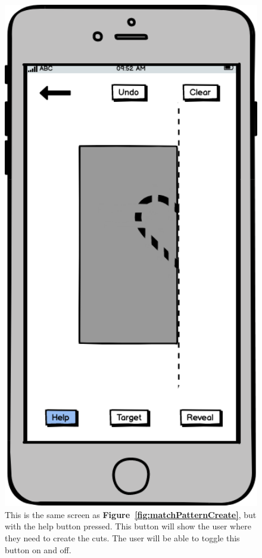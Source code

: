 \documentclass[11pt]{article}
\begin{document}
            \begin{figure}
                \begin{minipage}[c]{0.35\textwidth}
                \includegraphics[width=1\textwidth]{Images/Prototype/prototypeMatchPatternCreateHelp.png}
                \end{minipage}\hfill
                \begin{minipage}[c]{0.65\textwidth}
                \caption{This is the same screen as \textbf{Figure~\ref{fig:matchPatternCreate}}, but with the help button pressed. This button will show the user where they need to create the cuts. The user will be able to toggle this button on and off.}
                \label{fig:matchPatternCreateHelp}
                \end{minipage}
            \end{figure}
            
\end{document}
